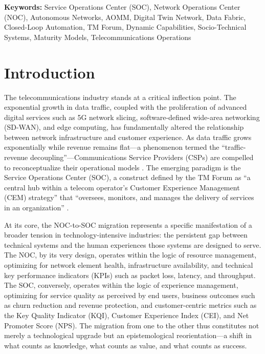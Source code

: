 \documentclass[12pt,a4paper]{article}
\begin{document}
\vspace{0.3cm}
\noindent\textbf{Keywords:} Service Operations Center (SOC), Network Operations Center (NOC), Autonomous Networks, AOMM, Digital Twin Network, Data Fabric, Closed-Loop Automation, TM Forum, Dynamic Capabilities, Socio-Technical Systems, Maturity Models, Telecommunications Operations

\newpage

\section{Introduction}

The telecommunications industry stands at a critical inflection point. The exponential growth in data traffic, coupled with the proliferation of advanced digital services such as 5G network slicing, software-defined wide-area networking (SD-WAN), and edge computing, has fundamentally altered the relationship between network infrastructure and customer experience. As data traffic grows exponentially while revenue remains flat---a phenomenon termed the ``traffic-revenue decoupling''---Communications Service Providers (CSPs) are compelled to reconceptualize their operational models \citep{tmforum2024a}. The emerging paradigm is the Service Operations Center (SOC), a construct defined by the TM Forum as ``a central hub within a telecom operator's Customer Experience Management (CEM) strategy'' that ``oversees, monitors, and manages the delivery of services in an organization'' \citep[p.~3]{tmforum2025soc}.

At its core, the NOC-to-SOC migration represents a specific manifestation of a broader tension in technology-intensive industries: the persistent gap between technical systems and the human experiences those systems are designed to serve. The NOC, by its very design, operates within the logic of resource management, optimizing for network element health, infrastructure availability, and technical key performance indicators (KPIs) such as packet loss, latency, and throughput. The SOC, conversely, operates within the logic of experience management, optimizing for service quality as perceived by end users, business outcomes such as churn reduction and revenue protection, and customer-centric metrics such as the Key Quality Indicator (KQI), Customer Experience Index (CEI), and Net Promoter Score (NPS). The migration from one to the other thus constitutes not merely a technological upgrade but an epistemological reorientation---a shift in what counts as knowledge, what counts as value, and what counts as success.
\end{document}
